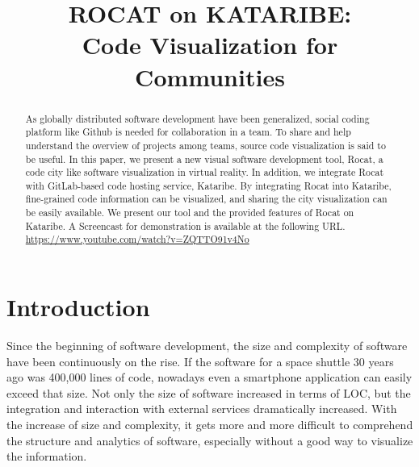 \documentclass[conference]{IEEEtran}
\begin{document}
\title{ROCAT on KATARIBE:\\ Code Visualization for Communities}

\author{

}

\maketitle

\begin{abstract}
As globally distributed software development have been generalized, social coding platform like Github is needed for collaboration in a team. To share and help understand the overview of projects among teams, source code visualization is said to be useful.
In this paper, we present a new visual software development tool, Rocat, a code city like software visualization in virtual reality. In addition, we integrate Rocat with GitLab-based code hosting service, Kataribe. By integrating Rocat into Kataribe, fine-grained code information can be visualized, and sharing the city visualization can be easily available. We present our tool and the provided features of Rocat on Kataribe.
A Screencast for demonstration is available at the following URL.\\
\url{https://www.youtube.com/watch?v=ZQTTO91v4No}
\end{abstract}



\section{Introduction}
Since the beginning of software development, the size and complexity of software have been continuously on the rise.
If the software for a space shuttle 30 years ago was 400,000 lines of code, nowadays even a smartphone application can easily exceed that size.
Not only the size of software increased in terms of LOC, but the integration and interaction with external services dramatically increased.
With the increase of size and complexity, it gets more and more difficult to comprehend the structure and analytics of software, especially without a good way to visualize the information.
\end{document}
